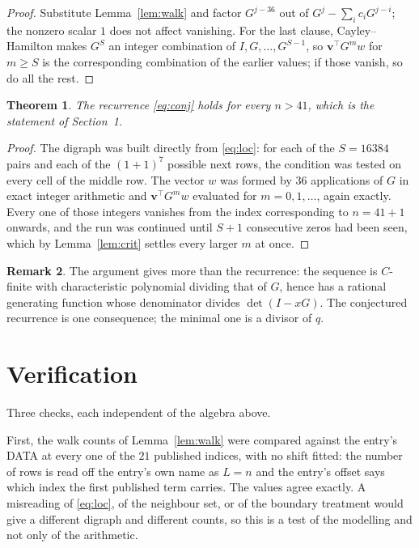 \documentclass[11pt,a4paper]{article}
\theoremstyle{plain}
\newtheorem{theorem}{Theorem}
\theoremstyle{definition}
\newtheorem{remark}[theorem]{Remark}
\begin{document}
\begin{proof}
Substitute Lemma~\ref{lem:walk} and factor $G^{j-36}$ out of
$G^{j}-\sum_ic_iG^{j-i}$; the nonzero scalar $1$ does not affect
vanishing. For the last clause, Cayley--Hamilton makes $G^{S}$ an integer combination of
$I,G,\dots,G^{S-1}$, so $\mathbf{v}^{\!\top}G^{m}w$ for $m\ge S$ is the corresponding
combination of the earlier values; if those vanish, so do all the rest.
\end{proof}

\begin{theorem}
The recurrence \eqref{eq:conj} holds for every $n>41$, which is the statement of
Section~1.
\end{theorem}

\begin{proof}
The digraph was built directly from \eqref{eq:loc}: for each of the $S=16384$ pairs and each
of the $(1+1)^{7}$ possible next rows, the condition was tested on every cell of
the middle row. The vector $w$ was formed by $36$ applications of $G$ in exact integer
arithmetic and $\mathbf{v}^{\!\top}G^{m}w$ evaluated for $m=0,1,\dots$, again exactly.
Every one of those integers vanishes from the index corresponding to $n=41+1$ onwards,
and the run was continued until $S+1$ consecutive zeros had been seen, which by
Lemma~\ref{lem:crit} settles every larger $m$ at once.
\end{proof}

\begin{remark}
The argument gives more than the recurrence: the sequence is $C$-finite with characteristic
polynomial dividing that of $G$, hence has a rational generating function whose denominator
divides $\det(I-xG)$. The conjectured recurrence is one consequence; the minimal one is a
divisor of $q$.
\end{remark}

\section{Verification}

Three checks, each independent of the algebra above.

First, the walk counts of Lemma~\ref{lem:walk} were compared against the entry's DATA at
every one of the $21$ published indices, with no shift fitted: the number of rows is
read off the entry's own name as $L=n$ and the entry's offset says which index the first
published term carries. The values agree exactly. A misreading of \eqref{eq:loc}, of the
neighbour set, or of the boundary treatment would give a different digraph and different
counts, so this is a test of the modelling and not only of the arithmetic.
\end{document}
